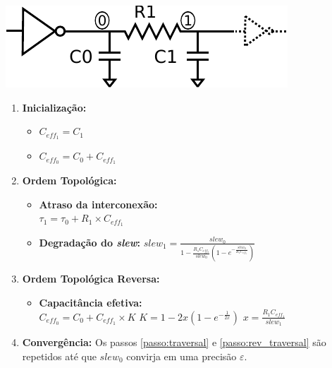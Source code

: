 \documentclass[10pt,a4paper]{beamer}
\begin{document}
		\begin{frame}
			\begin{minipage}{0.4\textwidth}
				\includegraphics[width=\textwidth]{img/pi.pdf} 

			\end{minipage}
			\begin{minipage}{0.5\textwidth}
				
				\pause
				\begin{enumerate}[<+->]
					\item \textbf{Inicialização: } \\
						\begin{itemize}
							\item $C_{eff_1} = C_1$
							\item $C_{eff_0} = C_0 + C_{eff_1}$
						\end{itemize}
					\item \textbf{Ordem Topológica:} \label{passo:traversal}
						\begin{itemize}
							\item \textbf{Atraso da interconexão:} \\
								$\tau_1 = \tau_0 + R_1 \times C_{eff_1}$
							\item \textbf{Degradação do \textit{slew}: }
								$slew_1 = \frac{slew_0}{1 - \frac{R_1 C_{eff_1}}{slew_0} (1 - e^{-\frac{slew_0}{R_1 C_{eff_1}}})}$
						\end{itemize}
					\item \textbf{Ordem Topológica Reversa:} \label{passo:rev_traversal}
						\begin{itemize}
							\item \textbf{Capacitância efetiva:}\\
								$C_{eff_0} = C_0 + C_{eff_1} \times K$ 
								$K = 1 - 2x(1 - e^{-\frac{1}{2x}})$
								$x = \frac{R_1C_{eff_1}}{slew_1}$
						\end{itemize}
					\item \textbf{Convergência:} Os passos \textcolor{azul}{\ref{passo:traversal}} e \textcolor{azul}{\ref{passo:rev_traversal}} são repetidos até que $slew_0$ convirja em uma precisão $\varepsilon$.
				\end{enumerate}
			\end{minipage}		
		\end{frame}
\end{document}
